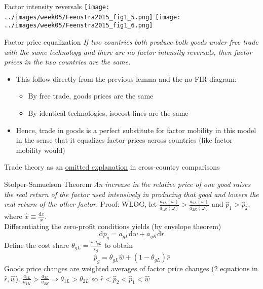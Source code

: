 \documentclass[11pt,notes=hide,aspectratio=169]{beamer}
\begin{document}
\begin{frame}{Factor intensity reversals}
\texttt{[image: ../images/week05/Feenstra2015\_fig1\_5.png]}
\texttt{[image: ../images/week05/Feenstra2015\_fig1\_6.png]}
\end{frame}
\begin{frame}{Factor price equalization}
\textit{If two countries both produce both goods under free trade with the same technology and there are no factor intensity reversals, then factor prices in the two countries are the same.}
\begin{itemize}
	\item This follow directly from the previous lemma and the no-FIR diagram:
	\begin{itemize}
		\item By free trade, goods prices are the same
		\item By identical technologies, isocost lines are the same
	\end{itemize}
	\item Hence, trade in goods is a perfect substitute for factor mobility in this model in the sense that it equalizes factor prices across countries (like factor mobility would)
\end{itemize}
Trade theory as an \href{https://twitter.com/TradeDiversion/status/1445739902105128963}{omitted explanation} in cross-country comparisons
\end{frame}
\begin{frame}{Stolper-Samuelson Theorem}
\textit{An increase in the relative price of one good raises the real return of the factor used intensively in producing that good and lowers the real return of the other factor.}
Proof:
WLOG, let $\frac{a_{1L}(\omega)}{a_{1K}(\omega)}>\frac{a_{2L}(\omega)}{a_{2K}(\omega)}$
and $\hat{p}_{1}>\hat{p}_{2}$,
where $\hat{x} \equiv \frac{\textrm{d}x}{x}$. \\
Differentiating the zero-profit conditions yields (by envelope theorem)
\begin{equation*}
\textrm{d}p_{g}=a_{gL}\textrm{d}w+a_{gK}\textrm{d}r
\end{equation*}
Define the cost share $\theta _{gL}=\frac{wa_{gL}}{c_{g}}$
to obtain
\begin{equation*}
\hat{p}_{g}=\theta _{gL}\hat{w}+\left( 1-\theta _{gL}\right) \hat{r}
\end{equation*}
Goods price changes are weighted averages of factor price changes (2 equations in $\hat{r},\hat{w}$).
$\frac{a_{1L}}{a_{1K}}>\frac{a_{2L}}{a_{2K}} \Rightarrow \theta
_{1L}>\theta _{2L}$
so 
$\hat{r}<\hat{p}_{2}<\hat{p}_{1}<\hat{w}$
\end{frame}
\end{document}
